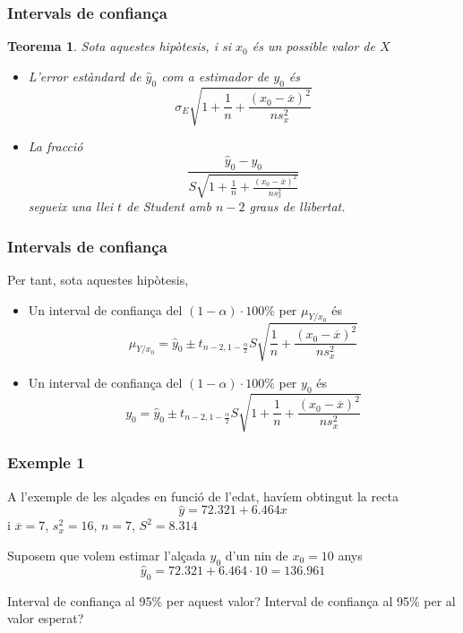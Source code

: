 \documentclass[12pt,t]{beamer}
\theoremstyle{plain}
\newtheorem{teorema}{Teorema}
\theoremstyle{definition}
\begin{document}
\begin{frame}
\frametitle{Intervals de confiança}
\begin{teorema}
Sota aquestes hipòtesis, i si $x_0$ és un possible valor de $X$
\begin{itemize}
\item L'error estàndard de $\widehat{y}_0$ com a estimador de $y_0$ és
$$
\sigma_E\sqrt{1+\frac{1}{n}+\frac{(x_0-\overline{x})^2}{ns^2_x}}
$$

\item La fracció
$$
\frac{\widehat{y}_0-y_0}{S\sqrt{1+\frac{1}{n}+\frac{(x_0-\overline{x})^2}{n
s^2_x}}}
$$
segueix una llei $t$ de Student amb $n-2$ graus de llibertat.
\end{itemize}
\end{teorema}
\end{frame}





\begin{frame}
\frametitle{Intervals de confiança}
Per tant, sota aquestes hipòtesis,
\begin{itemize}
\item Un interval de confiança del $(1-\alpha)\cdot 100\%$ per $\mu_{Y/x_0}$ és
$$
\mu_{Y/x_0}=\widehat{y}_0\pm t_{n-2,1-\frac{\alpha}{2}} S\sqrt{\frac{1}{n}+\frac{(x_0-\overline{x})^2}{n
s^2_x}}
$$

\item Un interval de confiança del $(1-\alpha)\cdot 100\%$ per $y_0$ és
$$
y_0=\widehat{y}_0\pm t_{n-2,1-\frac{\alpha}{2}} S\sqrt{1+\frac{1}{n}+\frac{(x_0-\overline{x})^2}{n
s^2_x}}
$$
\end{itemize}

\end{frame}



\begin{frame}
\frametitle{Exemple 1}
\vspace*{-2ex}

A l'exemple de les alçades en funció de l'edat, havíem obtingut la recta
$$
\widehat{y}=72.321+6.464x
$$
i $\overline{x}=7$, $s_x^2=16$, $n=7$, $S^2=8.314$
\medskip

Suposem que volem estimar l'alçada $y_0$ d'un nin de $x_0=10$ anys  
$$
\widehat{y}_0=72.321+6.464\cdot 10=136.961
$$

Interval de confiança al 95\% per aquest valor? Interval de confiança al 95\% per al valor esperat?
\end{frame}
\end{document}
